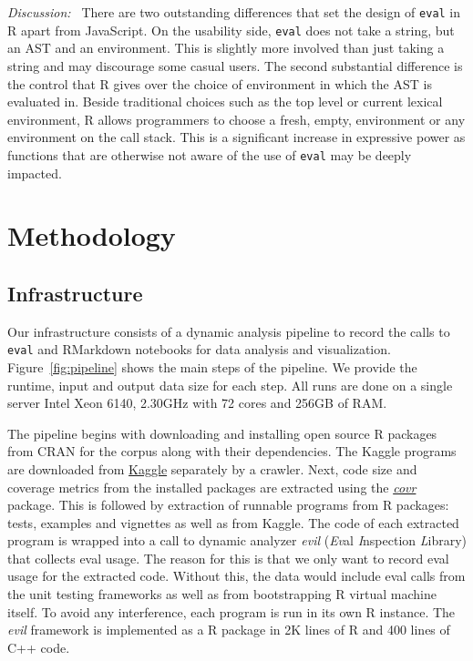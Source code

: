 \documentclass[a4paper,USenglish,cleveref, autoref, thm-restate]{lipics-v2019}
\newcommand{\eval}{\texttt{eval}\xspace}
\newcommand{\covr}{\emph{covr}\xspace}
\begin{document}
\medskip\emph{Discussion:~} There are two outstanding differences that set
the design of \eval in R apart from JavaScript. On the usability side, \eval
does not take a string, but an AST and an environment. This is slightly more
involved than just taking a string and may discourage some casual users.
The second substantial difference is the control that R gives over the
choice of environment in which the AST is evaluated in. Beside traditional
choices such as the top level or current lexical environment, R allows
programmers to choose a fresh, empty, environment or any environment on the
call stack. This is a significant increase in expressive power as functions
that are otherwise not aware of the use of \eval may be deeply impacted.

\section{Methodology}

\subsection{Infrastructure}

Our infrastructure consists of a dynamic analysis pipeline to record the
calls to \eval and RMarkdown notebooks for data analysis and visualization.
Figure~\ref{fig:pipeline} shows the main steps of the pipeline. We provide
the runtime, input and output data size for each step. All runs are done on
a single server Intel Xeon 6140, 2.30GHz with 72 cores and 256GB of RAM.

The pipeline begins with downloading and installing open source R packages
from CRAN for the corpus along with their dependencies. The Kaggle programs
are downloaded from \href{http://www.kaggle.com}{Kaggle} separately by a
crawler.  Next, code size and coverage metrics from the installed packages
are extracted using the \href{ https://github.com/r-lib/covr}{\covr}
package. This is followed by extraction of runnable programs from R
packages: tests, examples and vignettes as well as from Kaggle. The code of
each extracted program is wrapped into a call to dynamic analyzer
\emph{evil} (\emph{Ev}al \emph{I}nspection \emph{L}ibrary) that collects eval
usage. The reason for this is that we only want to record eval usage for the
extracted code. Without this, the data would include eval calls from the
unit testing frameworks as well as from bootstrapping R virtual machine
itself. To avoid any interference, each program is run in its own R
instance. The \emph{evil} framework is implemented as a R package in 2K lines of
R and 400 lines of C++ code.
\end{document}
